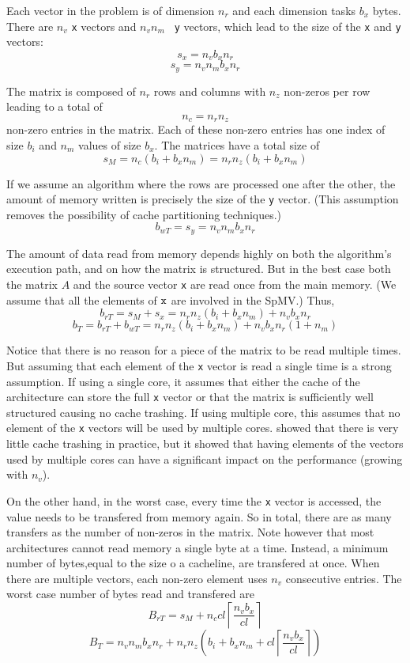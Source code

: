 \documentclass[10pt,conference,compsocconf]{IEEEtran}
\newcommand{\ceil}[1]{\left\lceil#1\right\rceil}
\begin{document}
Each vector in the problem is of dimension $n_r$ and each dimension
tasks $b_x$ bytes. There are $n_v$ {\tt x} vectors and $n_v n_m$ {\tt
  y} vectors, which lead to the size of the {\tt x} and {\tt y} vectors:
$$s_x = n_v b_x n_r$$ $$s_y = n_v n_m b_x n_r$$

The matrix is composed of $n_r$ rows and columns with $n_z$ non-zeros
per row leading to a total of $$n_c = n_r n_z$$ non-zero entries in
the matrix. Each of these non-zero entries has one index of size $b_i$
and $n_m$ values of size $b_x$. The matrices have a total size
of $$s_M = n_c (b_i + b_x n_m) = n_r n_z (b_i + b_x n_m)$$

If we assume an algorithm where the rows are processed one after
the other, the amount of memory written is precisely the
size of the {\tt y} vector. (This assumption removes the possibility of
cache partitioning techniques.) $$b_{wT} = s_y = n_v n_m b_x n_r$$

The amount of data read from memory depends highly on both the algorithm's
execution path, and on %
how the matrix is structured. But in the best case
both the matrix $A$ %
and the source vector {\tt x} are read once
from the main memory. (We assume that all the elements of $\tt x$ are involved
in the SpMV.)  %
Thus, $$b_{rT} = s_M + s_x = n_r n_z
(b_i + b_x n_m) + n_v b_x n_r$$
 $$b_T = b_{rT} + b_{wT} =  n_r n_z (b_i + b_x n_m) + n_v b_x n_r (1 + n_m)$$

Notice that there is no reason for a piece of the matrix to be read
multiple times. But assuming that each element of the {\tt x} vector
is read a single time is a strong assumption. If using a single core,
it assumes that either the cache of the architecture can store the full
{\tt x} vector or that the matrix is sufficiently well structured 
causing no cache trashing. If using multiple core, this assumes that
no element of the {\tt x} vectors will be used by multiple
cores. \cite{Saule12} showed that there is very little cache trashing
in practice, but it showed that having elements of the vectors used by
multiple cores can have a significant impact on the performance
(growing with $n_v$).

On the other hand, in the worst case, every time the {\tt x} vector is
accessed, the value needs to be transfered from memory again. So in
total, there are as many transfers as the number of non-zeros in the
matrix. Note however that most architectures cannot read memory a single 
byte at a time. Instead, a minimum number of bytes,equal to the size o a cacheline, 
are transfered at once. 
When there are multiple
vectors, each non-zero element uses $n_v$ consecutive entries. The
worst case number of bytes read and transfered are 
$$B_{rT} = s_M + n_c cl \ceil{\frac{n_vb_x}{cl}} $$ 
$$B_T = n_v n_m b_x n_r + n_r n_z \left ( b_i + b_x n_m +  cl \ceil{\frac{n_vb_x}{cl}} \right)$$
\end{document}
